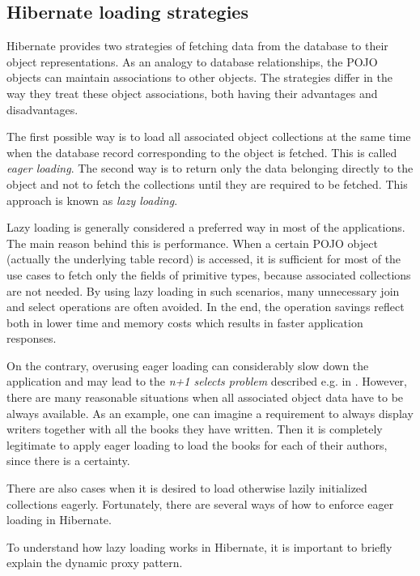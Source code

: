 \documentclass[12pt, oneside, a4paper]{book}
\begin{document}

\subsection{Hibernate loading strategies}

Hibernate provides two strategies of fetching data from the database to their object representations. 
As an analogy to database relationships, the POJO objects can maintain associations to other objects. 
The strategies differ in the way they treat these object associations, both having their advantages and disadvantages. 

The first possible way is to load all associated object collections at the same time when the database record corresponding to the object is fetched. 
This is called \textit{eager loading}. 
The second way is to return only the data belonging directly to the object and not to fetch the collections until they are required to be fetched. 
This approach is known as \textit{lazy loading}. 

Lazy loading is generally considered a preferred way in most of the applications.
The main reason behind this is performance.
When a certain POJO object (actually the underlying table record) is accessed, it is sufficient for most of the use cases to fetch only the fields of primitive types, because associated collections are not needed. 
By using lazy loading in such scenarios, many unnecessary join and select operations are often avoided. 
In the end, the operation savings reflect both in lower time and memory costs which results in faster application responses. 

On the contrary, overusing eager loading can considerably slow down the application and may lead to the \textit{n+1 selects problem} described e.g. in \cite{HibernateInAction:2004}.	
However, there are many reasonable situations when all associated object data have to be always available. 
As an example, one can imagine a requirement to always display writers together with all the books they have written. 
Then it is completely legitimate to apply eager loading to load the books for each of their authors, since there is a certainty.

There are also cases when it is desired to load otherwise lazily initialized collections eagerly.
Fortunately, there are several ways of how to enforce eager loading in Hibernate.

To understand how lazy loading works in Hibernate, it is important to briefly explain the dynamic proxy pattern. 
\end{document}
